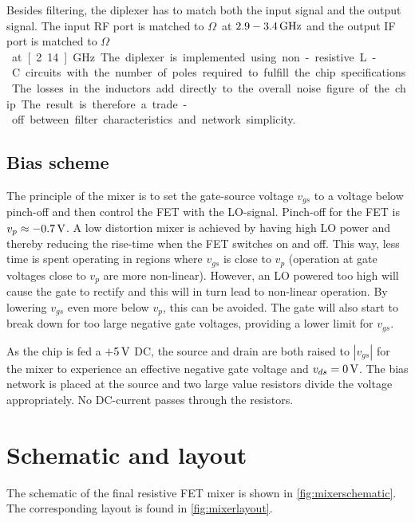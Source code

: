 			Besides  filtering, the diplexer has to match  both the input signal and the output signal. The input RF port is matched to \unit[50]{$\Omega$} at $\unit[2.9-3.4]{GHz}$ and the output IF port is matched to \unit[50]{$\Omega$} at \unit[2.14]{GHz}.

			The diplexer is implemented using non-resistive L-C circuits with the number of poles required to fulfill the chip specifications. The losses in the inductors add directly to the overall noise figure of the chip. The result is therefore a trade-off between filter characteristics and network simplicity.

		\subsection{Bias scheme}\label{sec:mixerbias}
			The principle of the mixer is to set the gate-source voltage $v_{gs}$ to a voltage below pinch-off and then control the FET with the LO-signal. Pinch-off for the FET is $v_p\approx \unit[-0.7]{V}$. A low distortion mixer is achieved by having high LO power and thereby reducing the rise-time when the FET switches on and off. This way, less time is spent operating in regions where $v_{gs}$ is close to $v_p$ (operation at gate voltages close to $v_p$ are more non-linear). However, an LO powered too high will cause the gate to rectify and this will in turn lead to non-linear operation.\autocite{maas98} By lowering $v_{gs}$ even more below $v_p$, this can be avoided. The gate will also start to break down for too large negative gate voltages, providing a lower limit for $v_{gs}$.

			As the chip is fed a $+\unit[5]{V}$ DC, the source and drain are both raised to $|v_{gs}|$ for the mixer to experience an effective negative gate voltage and $v_{ds}=\unit[0]{V}$. The bias network is placed at the source and two large value resistors divide the voltage appropriately. No DC-current passes through the resistors.

	\section{Schematic and layout}
		The schematic of the final resistive FET mixer is shown in \autoref{fig:mixerschematic}. The corresponding layout is found in \autoref{fig:mixerlayout}.

